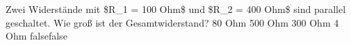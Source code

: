     {Zwei Widerstände mit \$R\_1 = 100 Ohm\$ und \$R\_2 = 400 Ohm\$ sind parallel geschaltet. Wie groß ist der Gesamtwiderstand?}
    {80 Ohm}
    {500 Ohm}
    {300 Ohm}
    {4 Ohm}
    {false}{false}